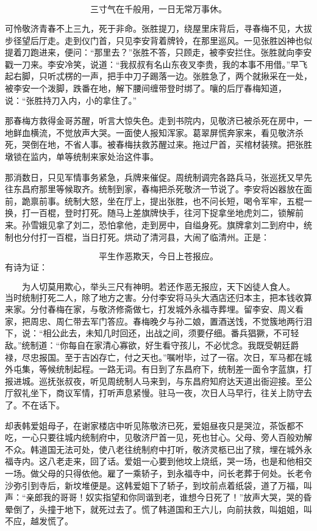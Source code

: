 \[
三寸气在千般用，一日无常万事休。
\]

可怜敬济青春不上三九，死于非命。张胜提刀，绕屋里床背后，寻春梅不见，大拔步径望后厅走。走到仪门首，只见李安背着牌铃，在那里巡风。一见张胜凶神也似提着刀跑进来，便问：“那里去？”张胜不答，只顾走，被李安拦住。张胜就向李安戳一刀来。李安冷笑，说道：“我叔叔有名山东夜叉李贵，我的本事不用借。”早飞起右脚，只听忒楞的一声，把手中刀子踢落一边。张胜急了，两个就揪采在一处，被李安一个泼脚，跌番在地，解下腰间缠带登时绑了。嚷的后厅春梅知道，说：“张胜持刀入内，小的拿住了。”

那春梅方救得金哥苏醒，听言大惊失色。走到书院内，见敬济已被杀死在房中，一地鲜血横流，不觉放声大哭。一面使人报知浑家。葛翠屏慌奔家来，看见敬济杀死，哭倒在地，不省人事。被春梅扶救苏醒过来。拖过尸首，买棺材装殡。把张胜墩锁在监内，单等统制来家处治这件事。

那消数日，只见军情事务紧急，兵牌来催促。周统制调完各路兵马，张巡抚又早先往东昌府那里等候取齐。统制到家，春梅把杀死敬济一节说了。李安将凶器放在面前，跪禀前事。统制大怒，坐在厅上，提出张胜，也不问长短，喝令军牢，五棍一换，打一百棍，登时打死。随马上差旗牌快手，往河下捉拿坐地虎刘二，锁解前来。孙雪娥见拿了刘二，恐怕拿他，走到房中，自缢身死。旗牌拿刘二到府中，统制也分付打一百棍，当日打死。烘动了清河县，大闹了临清州。正是：

\[
平生作恶欺天，今日上苍报应。
\]
有诗为证：

\[
为人切莫用欺心，举头三尺有神明。
若还作恶无报应，天下凶徒人食人。
\]
当时统制打死二人，除了地方之害。分付李安将马头大酒店还归本主，把本钱收算来家。分付春梅在家，与敬济修斋做七，打发城外永福寺葬埋。留李安、周义看家，把周忠、周仁带去军门答应。春梅晚夕与孙二娘，置酒送饯，不觉簇地两行泪下，说：“相公此去，未知几时回还，出战之间，须要仔细。番兵猖獗，不可轻敌。”统制道：“你每自在家清心寡欲，好生看守孩儿，不必忧念。我既受朝廷爵禄，尽忠报国。至于吉凶存亡，付之天也。”嘱咐毕，过了一宿。次日，军马都在城外屯集，等候统制起程。一路无词。有日到了东昌府下，统制差一面令字蓝旗，打报进城。巡抚张叔夜，听见周统制人马来到，与东昌府知府达天道出衙迎接。至公厅叙礼坐下，商议军情，打听声息紧慢。驻马一夜，次日人马早行，往关上防守去了。不在话下。

却表韩爱姐母子，在谢家楼店中听见陈敬济已死，爱姐昼夜只是哭泣，茶饭都不吃，一心只要往城内统制府中，见敬济尸首一见，死也甘心。父母、旁人百般劝解不众。韩道国无法可处，使八老往统制府中打听，敬济灵柩已出了殡，埋在城外永福寺内。这八老走来，回了话。爱姐一心要到他坟上烧纸，哭一场，也是和他相交一场。做父母的只得依他。雇了一乘轿子，到永福寺中，问长老葬于何处。长老令沙弥引到寺后，新坟堆便是。这韩爱姐下了轿子，到坟前点着纸袋，道了万福，叫声：“亲郎我的哥哥！奴实指望和你同谐到老，谁想今日死了！”放声大哭，哭的昏晕倒了，头撞于地下，就死过去了。慌了韩道国和王六儿，向前扶救，叫姐姐，叫不应，越发慌了。

